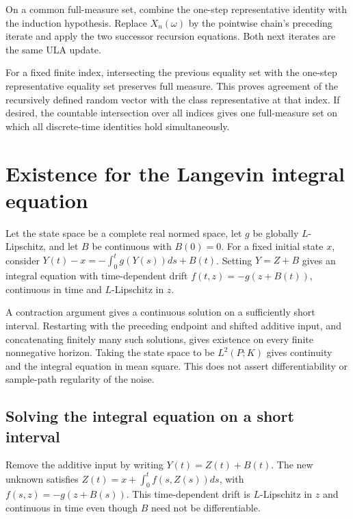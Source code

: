 \documentclass[11pt,a4paper]{report}
\begin{document}
On a common full-measure set, combine the one-step representative identity with the induction hypothesis. Replace \(X_n(\omega)\) by the pointwise chain’s preceding iterate and apply the two successor recursion equations. Both next iterates are the same ULA update.



For a fixed finite index, intersecting the previous equality set with the one-step representative equality set preserves full measure. This proves agreement of the recursively defined random vector with the class representative at that index. If desired, the countable intersection over all indices gives one full-measure set on which all discrete-time identities hold simultaneously.

\section{\texorpdfstring{Existence for the Langevin integral equation}{Existence for the Langevin integral equation}}
\label{proof-module-UnadjustedLangevin-LangevinIntegral-lean}


Let the state space be a complete real normed space, let \(g\) be globally \(L\)-Lipschitz, and let \(B\) be continuous with \(B(0)=0\). For a fixed initial state \(x\), consider \(Y(t)-x=-\int_0^tg(Y(s))ds+B(t)\). Setting \(Y=Z+B\) gives an integral equation with time-dependent drift \(f(t,z)=-g(z+B(t))\), continuous in time and \(L\)-Lipschitz in \(z\).



A contraction argument gives a continuous solution on a sufficiently short interval. Restarting with the preceding endpoint and shifted additive input, and concatenating finitely many such solutions, gives existence on every finite nonnegative horizon. Taking the state space to be \(L^2(P;K)\) gives continuity and the integral equation in mean square. This does not assert differentiability or sample-path regularity of the noise.

\subsection{\texorpdfstring{Solving the integral equation on a short interval}{Solving the integral equation on a short interval}}
\label{report-step-UnadjustedLangevin-LangevinIntegral-lean-1}


Remove the additive input by writing \(Y(t)=Z(t)+B(t)\). The new unknown satisfies \(Z(t)=x+\int_0^t f(s,Z(s))ds\), with \(f(s,z)=-g(z+B(s))\). This time-dependent drift is \(L\)-Lipschitz in \(z\) and continuous in time even though \(B\) need not be differentiable.
\end{document}
